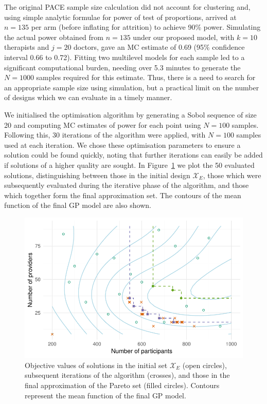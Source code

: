 \documentclass[]{sagej}
\begin{document}
The original PACE sample size calculation did not account for clustering and, using simple analytic formulae for power of test of proportions, arrived at $n = 135$ per arm (before inflating for attrition) to achieve 90\% power. Simulating the actual power obtained from $n=135$ under our proposed model, with $k = 10$ therapists and $j = 20$ doctors, gave an MC estimate of 0.69 (95\% confidence interval 0.66 to 0.72). Fitting two multilevel models for each sample led to a significant computational burden, needing over 5.3 minutes to generate the $N=1000$ samples required for this estimate. Thus, there is a need to search for an appropriate sample size using simulation, but a practical limit on the number of designs which we can evaluate in a timely manner. 

We initialised the optimisation algorithm by generating a Sobol sequence of size 20 and computing MC estimates of power for each point using $N = 100$ samples. Following this, 30 iterations of the algorithm were applied, with $N = 100$ samples used at each iteration. We chose these optimisation parameters to ensure a solution could be found quickly, noting that further iterations can easily be added if solutions of a higher quality are sought. In Figure~\ref{fig:ex1_single_run} we plot the 50 evaluated solutions, distinguishing between those in the initial design $\mathcal{X}_{E}$, those which were subsequently evaluated during the iterative phase of the algorithm, and those which together form the final approximation set. The contours of the mean function of the final GP model are also shown. 

\begin{figure}
\centering
\includegraphics[scale=0.8]{./Figures/ex1_single_run}
\caption{Objective values of solutions in the initial set $\mathcal{X}_{E}$ (open circles), subsequent iterations of the algorithm (crosses), and those in the final approximation of the Pareto set (filled circles). Contours represent the mean function of the final GP model.}
\label{fig:ex1_single_run}
\end{figure}
\end{document}
